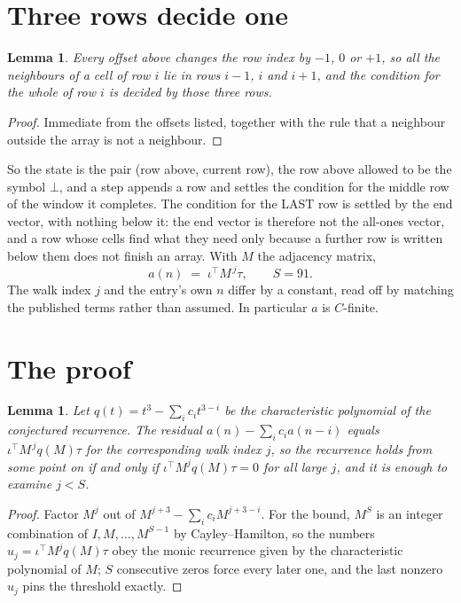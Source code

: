 \documentclass[11pt,a4paper]{article}
\theoremstyle{plain}
\newtheorem{lemma}[theorem]{Lemma}
\theoremstyle{definition}
\begin{document}
\section{Three rows decide one}

\begin{lemma}\label{lem:win}
Every offset above changes the row index by $-1$, $0$ or $+1$, so all the neighbours of a cell
of row $i$ lie in rows $i-1$, $i$ and $i+1$, and the condition for the whole of row $i$ is
decided by those three rows.
\end{lemma}

\begin{proof}
Immediate from the offsets listed, together with the rule that a neighbour outside the array is
not a neighbour.
\end{proof}

So the state is the pair (row above, current row), the row above allowed to be the symbol
$\bot$, and a step appends a row and settles the condition for the middle row of the window it
completes. The condition for the LAST row is settled by the end vector, with nothing below it:
the end vector is therefore not the all-ones vector, and a row whose cells find what they need
only because a further row is written below them does not finish an array. With $M$ the
adjacency matrix,
\[
a(n)\;=\;\iota^{\!\top}M^{\,j}\tau ,\qquad S=91.
\]
The walk index $j$ and the entry's own $n$ differ by a constant, read off by matching the
published terms rather than assumed. In particular $a$ is $C$-finite.

\section{The proof}

\begin{lemma}\label{lem:crit}
Let $q(t)=t^{3}-\sum_i c_it^{3-i}$ be the characteristic polynomial of the
conjectured recurrence. The residual $a(n)-\sum_ic_ia(n-i)$ equals
$\iota^{\!\top}M^{\,j}q(M)\tau$ for the corresponding walk index $j$, so the recurrence
holds from some point on if and only if $\iota^{\!\top}M^{j}q(M)\tau=0$ for all large $j$,
and it is enough to examine $j<S$.
\end{lemma}

\begin{proof}
Factor $M^{j}$ out of $M^{j+3}-\sum_ic_iM^{j+3-i}$. For the bound, $M^{S}$
is an integer combination of $I,M,\dots,M^{S-1}$ by Cayley--Hamilton, so the numbers
$u_j=\iota^{\!\top}M^{j}q(M)\tau$ obey the monic recurrence given by the characteristic
polynomial of $M$; $S$ consecutive zeros force every later one, and the last nonzero $u_j$
pins the threshold exactly.
\end{proof}
\end{document}

